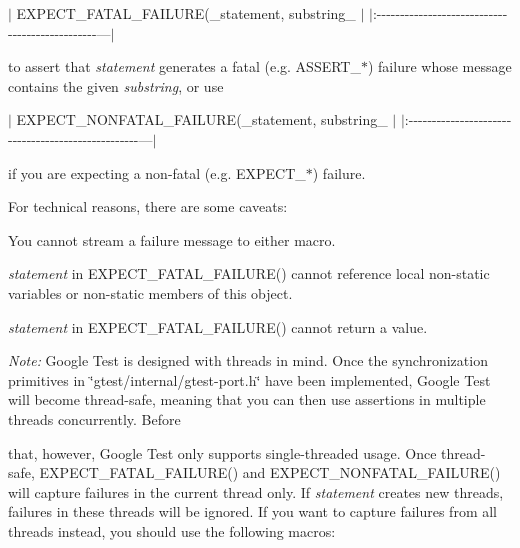 $\vert$ {\ttfamily E\+X\+P\+E\+C\+T\+\_\+\+F\+A\+T\+A\+L\+\_\+\+F\+A\+I\+L\+U\+RE(}\+\_\+statement, substring\+\_\+{\ttfamily );} $\vert$ $\vert$\+:-\/-\/-\/-\/-\/-\/-\/-\/-\/-\/-\/-\/-\/-\/-\/-\/-\/-\/-\/-\/-\/-\/-\/-\/-\/-\/-\/-\/-\/-\/-\/-\/-\/-\/-\/-\/-\/-\/-\/-\/-\/-\/-\/-\/-\/-\/-\/---$\vert$

to assert that {\itshape statement} generates a fatal (e.\+g. {\ttfamily A\+S\+S\+E\+R\+T\+\_\+$\ast$}) failure whose message contains the given {\itshape substring}, or use

$\vert$ {\ttfamily E\+X\+P\+E\+C\+T\+\_\+\+N\+O\+N\+F\+A\+T\+A\+L\+\_\+\+F\+A\+I\+L\+U\+RE(}\+\_\+statement, substring\+\_\+{\ttfamily );} $\vert$ $\vert$\+:-\/-\/-\/-\/-\/-\/-\/-\/-\/-\/-\/-\/-\/-\/-\/-\/-\/-\/-\/-\/-\/-\/-\/-\/-\/-\/-\/-\/-\/-\/-\/-\/-\/-\/-\/-\/-\/-\/-\/-\/-\/-\/-\/-\/-\/-\/-\/-\/-\/-\/---$\vert$

if you are expecting a non-\/fatal (e.\+g. {\ttfamily E\+X\+P\+E\+C\+T\+\_\+$\ast$}) failure.

For technical reasons, there are some caveats\+:


\begin{DoxyEnumerate}
\item You cannot stream a failure message to either macro.
\end{DoxyEnumerate}
\begin{DoxyEnumerate}
\item {\itshape statement} in {\ttfamily E\+X\+P\+E\+C\+T\+\_\+\+F\+A\+T\+A\+L\+\_\+\+F\+A\+I\+L\+U\+R\+E()} cannot reference local non-\/static variables or non-\/static members of {\ttfamily this} object.
\end{DoxyEnumerate}
\begin{DoxyEnumerate}
\item {\itshape statement} in {\ttfamily E\+X\+P\+E\+C\+T\+\_\+\+F\+A\+T\+A\+L\+\_\+\+F\+A\+I\+L\+U\+R\+E()} cannot return a value.
\end{DoxyEnumerate}

{\itshape Note\+:} Google Test is designed with threads in mind. Once the synchronization primitives in {\ttfamily \char`\"{}gtest/internal/gtest-\/port.\+h\char`\"{}} have been implemented, Google Test will become thread-\/safe, meaning that you can then use assertions in multiple threads concurrently. Before

that, however, Google Test only supports single-\/threaded usage. Once thread-\/safe, {\ttfamily E\+X\+P\+E\+C\+T\+\_\+\+F\+A\+T\+A\+L\+\_\+\+F\+A\+I\+L\+U\+R\+E()} and {\ttfamily E\+X\+P\+E\+C\+T\+\_\+\+N\+O\+N\+F\+A\+T\+A\+L\+\_\+\+F\+A\+I\+L\+U\+R\+E()} will capture failures in the current thread only. If {\itshape statement} creates new threads, failures in these threads will be ignored. If you want to capture failures from all threads instead, you should use the following macros\+:


